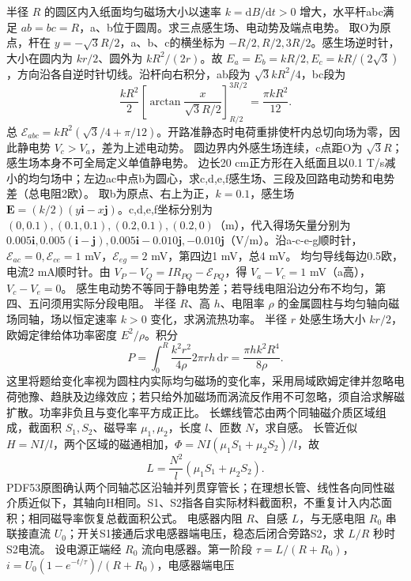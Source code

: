 \problemtext 半径 $R$ 的圆区内入纸面均匀磁场大小以速率 $k=\mathrm dB/\mathrm dt>0$ 增大，水平杆abc满足 $ab=bc=R$，a、b位于圆周。求三点感生场、电动势及端点电势。
\workings 取O为原点，杆在 $y=-\sqrt3R/2$，a、b、c的横坐标为 $-R/2,R/2,3R/2$。感生场逆时针，大小在圆内为 $kr/2$、圆外为 $kR^2/(2r)$。故 $E_a=E_b=kR/2,E_c=kR/(2\sqrt3)$，方向沿各自逆时针切线。沿杆向右积分，ab段为 $\sqrt3 kR^2/4$，bc段为
\[
\frac{kR^2}{2}\left[\arctan\frac{x}{\sqrt3R/2}\right]_{R/2}^{3R/2}
=\frac{\pi kR^2}{12}.
\]
总 $\mathcal E_{abc}=kR^2(\sqrt3/4+\pi/12)$。开路准静态时电荷重排使杆内总切向场为零，因此静电势 $V_c>V_a$，差为上述电动势。
\crosscheck 圆边界内外感生场连续，c点距O为 $\sqrt3R$；感生场本身不可全局定义单值静电势。
\problemtext 边长20 cm正方形在入纸面且以0.1 T/s减小的均匀场中；左边ac中点b为圆心，求c,d,e,f感生场、三段及回路电动势和电势差（总电阻2欧）。
\workings 取b为原点、右上为正，$k=0.1$，感生场 $\bm E=(k/2)(y\bm i-x\bm j)$。c,d,e,f坐标分别为 $(0,0.1),(0.1,0.1),(0.2,0.1),(0.2,0)$（m），代入得场矢量分别为 $0.005\bm i,0.005(\bm i-\bm j),0.005\bm i-0.010\bm j,-0.010\bm j$（V/m）。沿a-c-e-g顺时针，$\mathcal E_{ac}=0,\mathcal E_{ce}=1$ mV，$\mathcal E_{eg}=2$ mV，第四边1 mV，总4 mV。
均匀导线每边0.5欧，电流2 mA顺时针。由 $V_P-V_Q=IR_{PQ}-\mathcal E_{PQ}$，得 $V_a-V_c=1$ mV（a高），$V_c-V_e=0$。
\crosscheck 感生电动势不等同于静电势差；若导线电阻沿边分布不均匀，第四、五问须用实际分段电阻。
\problemtext 半径 $R$、高 $h$、电阻率 $\rho$ 的金属圆柱与均匀轴向磁场同轴，场以恒定速率 $k>0$ 变化，求涡流热功率。
\workings 半径 $r$ 处感生场大小 $kr/2$，欧姆定律给体功率密度 $E^2/\rho$。积分
\[
P=\int_0^R\frac{k^2r^2}{4\rho}2\pi rh\,\mathrm dr
=\frac{\pi hk^2R^4}{8\rho}.
\]
\crosscheck 这里将题给变化率视为圆柱内实际均匀磁场的变化率，采用局域欧姆定律并忽略电荷弛豫、趋肤及边缘效应；若只给外加磁场而涡流反作用不可忽略，须自洽求解磁扩散。功率非负且与变化率平方成正比。
\problemtext 长螺线管芯由两个同轴磁介质区域组成，截面积 $S_1,S_2$、磁导率 $\mu_1,\mu_2$，长度 $l$、匝数 $N$，求自感。
\workings 长管近似 $H=NI/l$，两个区域的磁通相加，$\Phi=NI(\mu_1S_1+\mu_2S_2)/l$，故
\[
L=\frac{N^2}{l}(\mu_1S_1+\mu_2S_2).
\]
\crosscheck PDF53原图确认两个同轴芯区沿轴并列贯穿管长；在理想长管、线性各向同性磁介质近似下，其轴向H相同。S1、S2指各自实际材料截面积，不重复计入内芯面积；相同磁导率恢复总截面积公式。
\problemtext 电感器内阻 $R$、自感 $L$，与无感电阻 $R_0$ 串联接直流 $U_0$；开关S1接通后求电感器端电压，稳态后闭合旁路S2，求 $L/R$ 秒时S2电流。
\workings 设电源正端经 $R_0$ 流向电感器。第一阶段 $\tau=L/(R+R_0)$，$i=U_0(1-e^{-t/\tau})/(R+R_0)$，电感器端电压

